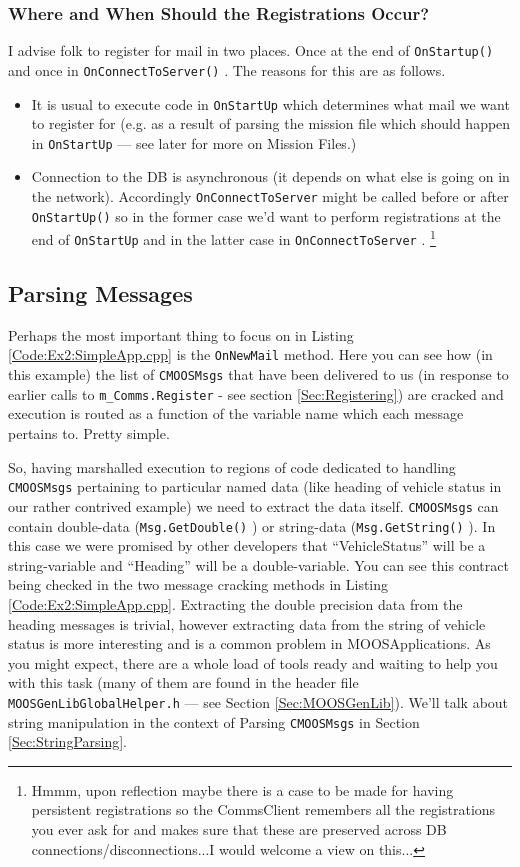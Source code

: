 \documentclass[a4paper,10pt]{article}
\newcommand{\Code}[1]{\texttt{#1} }
\newcommand{\code}[1]{\Code{#1} }
\begin{document}
\subsubsection{Where and When Should the Registrations Occur?}

I advise folk to register for mail in two places. Once at the end
of \code{OnStartup()} and once in \code{OnConnectToServer()}. The
reasons for this are as follows.
\begin{itemize}
\item It is usual to execute code in \code{OnStartUp} which
determines what mail we want to register for (e.g. as a result of
parsing the mission file which should happen in
\code{OnStartUp}--- see later for more on Mission Files.)
\item Connection to the DB is asynchronous (it depends on what
else is going on in the network). Accordingly
\code{OnConnectToServer} might be called before or after
\code{OnStartUp()} so in the former case we'd want to perform
registrations at the end of \code{OnStartUp} and in the latter
case in \code{OnConnectToServer}. \footnote{Hmmm, upon reflection
maybe there is a case to be made for having persistent
registrations so the CommsClient remembers all the registrations
you ever ask for and makes sure that these are preserved across DB
connections/disconnections...I would welcome a view on this...}
\end{itemize}


\subsection{Parsing Messages}\label{Sec:MailParsing}

Perhaps the most important thing to focus on in Listing
\ref{Code:Ex2:SimpleApp.cpp} is the \code{OnNewMail} method. Here
you can see how (in this example) the list of \code{CMOOSMsgs}
that have been delivered to us (in response to earlier calls to
\code{m\_Comms.Register} - see section \ref{Sec:Registering}) are
cracked and execution is routed as a function of the variable name
which each message pertains to. Pretty simple.

So, having marshalled execution to regions of code dedicated to
handling \code{CMOOSMsgs} pertaining to particular named data
(like heading of vehicle status in our rather contrived example)
we need to extract the data itself. \code{CMOOSMsgs} can contain
double-data (\code{Msg.GetDouble()}) or string-data
(\code{Msg.GetString()}). In this case we were promised by other
developers that ``VehicleStatus'' will be a string-variable and
``Heading'' will be a double-variable. You can see this contract
being checked in the two message cracking methods in Listing
\ref{Code:Ex2:SimpleApp.cpp}. Extracting the double precision data
from the heading messages is trivial, however extracting data from
the string of vehicle status is more interesting and is a common
problem in MOOSApplications. As you might expect, there are a whole
load of tools ready and waiting to help you with this task (many
of them are found in the header file
\code{MOOSGenLibGlobalHelper.h} --- see Section
\ref{Sec:MOOSGenLib}). We'll talk about string manipulation in the
context of Parsing \code{CMOOSMsgs} in Section
\ref{Sec:StringParsing}.
\end{document}
